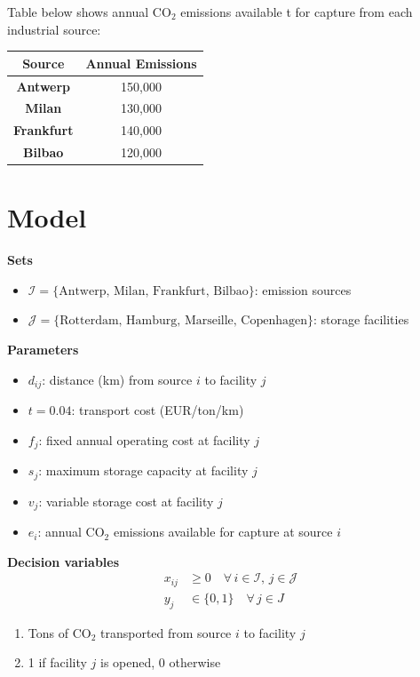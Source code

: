\documentclass[10pt]{article}
\begin{document}
Table below shows annual CO$_2$ emissions available t for capture from each industrial source: 
\begin{center}
    \begin{tabular}{|c|c|}
        \hline 
        \textbf{Source} & \textbf{Annual Emissions}\\\hline 
        \textbf{Antwerp} & 150,000\\\hline 
        \textbf{Milan} & 130,000\\\hline 
        \textbf{Frankfurt} & 140,000\\\hline 
        \textbf{Bilbao} & 120,000\\\hline 
    \end{tabular}
\end{center}

\section{Model}

\textbf{Sets}
\begin{itemize}
    \item $\mathcal{I} = \{\text{Antwerp, Milan, Frankfurt, Bilbao}\}$: emission sources
    \item $\mathcal{J} = \{\text{Rotterdam, Hamburg, Marseille, Copenhagen}\}$: storage facilities
\end{itemize}

\textbf{Parameters}
\begin{itemize}
    \item $d_{ij}$: distance (km) from source $i $ to facility $j $
    \item $t = 0.04 $: transport cost (EUR/ton/km)
    \item $f_j $: fixed annual operating cost at facility $j $
    \item $s_j $: maximum storage capacity at facility $j $
    \item $v_j $: variable storage cost at facility $j $
    \item $e_i $: annual CO$_2$ emissions available for capture at source $i $
\end{itemize}
\newpage
\textbf{Decision variables}
\begin{align}
    x_{ij} &\ge 0 \quad\forall\, i\in \mathcal{I},\, j\in \mathcal{J}\\
    y_j&\in \{0, 1\}\quad\forall\, j\in J 
\end{align}
\begin{enumerate}
    \item Tons of CO$_2$ transported from source $i $ to facility $j $
    \item 1 if facility $j $ is opened, 0 otherwise 
\end{enumerate}
\end{document}

